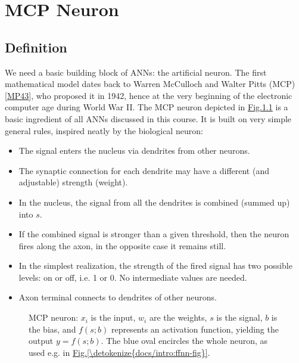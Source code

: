 \documentclass[letterpaper,10pt,english]{jupyterBook}
\let\sphinxpxdimen\pdfpxdimen\else\newdimen\sphinxpxdimen
\begin{document}
\chapter{MCP Neuron}
\label{\detokenize{docs/mcp:mcp-neuron}}\label{\detokenize{docs/mcp:mcp-lab}}\label{\detokenize{docs/mcp::doc}}

\section{Definition}
\label{\detokenize{docs/mcp:definition}}
\sphinxAtStartPar
We need a basic building block of ANNs: the artificial neuron. The first mathematical model dates back to Warren McCulloch and Walter Pitts (MCP){[}\hyperlink{cite.docs/conclusion:id9}{MP43}{]}, who proposed it in 1942, hence at the very beginning of the electronic computer age during World War II. The MCP neuron depicted in \hyperref[\detokenize{docs/mcp:mcp1-fig}]{Fig.\@ \ref{\detokenize{docs/mcp:mcp1-fig}}} is a basic ingredient of all ANNs discussed in this course. It is built on very simple general rules, inspired neatly by the biological neuron:
\begin{itemize}
\item {} 
\sphinxAtStartPar
The signal enters the nucleus via dendrites from other neurons.

\item {} 
\sphinxAtStartPar
The synaptic connection for each dendrite may have a different (and adjustable) strength (weight).

\item {} 
\sphinxAtStartPar
In the nucleus, the signal from all the dendrites is combined (summed up) into \(s\).

\item {} 
\sphinxAtStartPar
If the combined signal is stronger than a given threshold, then the neuron fires along the axon, in the opposite case it remains still.

\item {} 
\sphinxAtStartPar
In the simplest realization, the strength of the fired signal has two possible levels: on or off, i.e. 1 or 0. No intermediate values are needed.

\item {} 
\sphinxAtStartPar
Axon terminal connects to dendrites of other neurons.

\end{itemize}

\begin{figure}[htbp]
\centering
\capstart

\noindent\sphinxincludegraphics[width=320\sphinxpxdimen]{{mcp-1a}.png}
\caption{MCP neuron: \(x_i\) is the input, \(w_i\) are the weights, \(s\) is the signal, \(b\) is the bias, and \(f(s;b)\) represents an activation function, yielding the output \(y=f(s;b)\). The blue oval encircles the whole neuron, as used e.g. in \hyperref[\detokenize{docs/intro:ffnn-fig}]{Fig.\@ \ref{\detokenize{docs/intro:ffnn-fig}}}.}\label{\detokenize{docs/mcp:mcp1-fig}}\end{figure}
\end{document}
